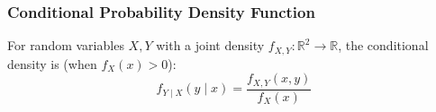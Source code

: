 \documentclass{beamer}
\newcommand{\Real}{\mathbb{R}}
\renewcommand{\P}[1]{\mathbb{P}\left[#1\right]}
\begin{document}
\begin{frame} \frametitle{Conditional Probability Density Function}
  For random variables $X, Y$ with a joint density $f_{X,Y}\colon \Real^2 \to \Real$, the conditional density is (when $f_X(x) > 0$):
  \[
   f_{Y \mid X}(y \mid  x) = \frac{f_{X,Y}(x,y)}{f_X(x)}
 \]
 \vspace{4cm}
\end{frame}

\end{document}
